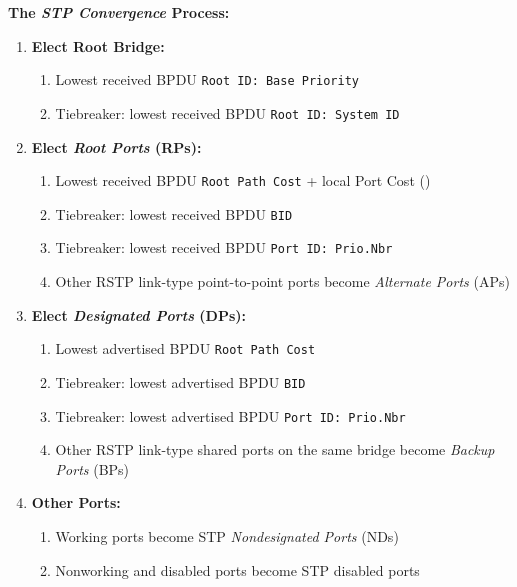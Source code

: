 \documentclass[12pt]{article}
\begin{document}
	\textbf{The \textit{STP Convergence} Process:}
	\begin{enumerate}
		\label{itm:STP CONVERGENCE}
		\item{\textbf{Elect Root Bridge:}}
		\begin{enumerate} \itemsep -5pt
			\item{Lowest received BPDU \texttt{Root ID: Base Priority}}
			\item{Tiebreaker: lowest received BPDU \texttt{Root ID: System ID}}
		\end{enumerate}
		\item{\textbf{Elect \textit{Root Ports} (RPs):}}
		\begin{enumerate} \itemsep -5pt
			\item{Lowest received BPDU \texttt{Root Path Cost} + local Port Cost ()}
			\item{Tiebreaker: lowest received BPDU \texttt{BID}}
			\item{Tiebreaker: lowest received BPDU \texttt{Port ID: Prio.Nbr}}
			\item{Other RSTP link-type point-to-point ports become \textit{Alternate Ports} (APs)}
		\end{enumerate}
		\item{\textbf{Elect \textit{Designated Ports} (DPs):}}
		\begin{enumerate} \itemsep -5pt
			\item{Lowest advertised BPDU \texttt{Root Path Cost}}
			\item{Tiebreaker: lowest advertised BPDU \texttt{BID}}
			\item{Tiebreaker: lowest advertised BPDU \texttt{Port ID: Prio.Nbr}}
			\item{Other RSTP link-type shared ports on the same bridge become \textit{Backup Ports} (BPs)}
		\end{enumerate}
		\item{\textbf{Other Ports:}}
		\begin{enumerate} \itemsep -5pt
			\item{Working ports become STP \textit{Nondesignated Ports} (NDs)}
			\item{Nonworking and disabled ports become STP disabled ports}
		\end{enumerate}
	\end{enumerate}
\end{document}
